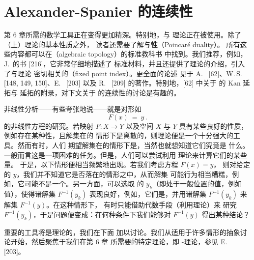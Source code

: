 
\section{Alexander-Spanier \trCohomology{}的连续性}
\label{sec:alexander-spanier-continuity}

%
%
%
%
%

第 6 章所需的数学工具正在变得更加精深。特别地，\trHomology{}与%
\trCohomology{}理论正在被使用。除了（上）\trHomology{}理论的基本性质之外，%
读者还需要了解\trCupProduct{}与\textbf{\trPoincare\trDual{}性}（Poincaré duality）。%
所有这些内容都可以在\textbf{\trAlgebraicTopology}（algebraic topology）的标准教科书
中找到。我们推荐，例如，J.~的书 [216]，它非常仔细地描述了
标准材料，并且还提供了\trFixedPoint{}理论的介绍，引入了与\trDegree{}理论
密切相关的\textbf{\trFixedPointIndex}（fixed point index）。更全面的\trAlgebraicTopology{}论述
见于 A.~\trDold{} [62]、W.\,S.~\trMassey{} [148, 149, 150]、E.~\trSpanier{} [203]
以及 R.~ [209] 的著作。特别地，[62] 中关于%
\trHomotopyInvariant{}\trFunctor{}的 Kan 延拓与 \trCech{}延拓的附录，对下文关于%
\trHomotopyInvariant{}\trFunctor{}的连续性的讨论是有趣的。

非线性分析——有些夸张地说——就是对形如
\[F(x)\ =\ y\,.
\]
的非线性方程的研究。若映射 $F\colon X\to Y$ 以及\trTopology{}空间 $X$ 与 $Y$%
具有某些良好的性质，例如存在某种\trCompact{}性，且解集在\trGeneric{}的%
情形下是离散的，则\trDegree{}理论便是一个十分强大的工具。然而有时，人们%
期望解集在\trGeneric{}的情形下是\trManifold，当然也就想知道它们究竟是%
什么。一般而言这是一项困难的任务。但是，人们可以尝试利用%
\trHomology{}理论来计算它们的某些\trInvariant{}量。
于是，以下情形便相当频繁地出现。若我们考虑方程 $F(x)=y$，%
则对给定的 $y$，我们并不知道它是否落在\trGeneric{}的情形之中，从而解集%
可能行为相当糟糕，例如，它可能不是一个\trManifold。另一方面，可以选取%
\trGeneric{}的 $y_{k}$（即处于一般位置的值，例如\trRegular{}值），使得诸解集%
 $F^{-1}(y_{k})$ 表现良好，例如，它们是\trManifold，并用诸解集%
 $F^{-1}(y_{k})$ 来\trApproximation{}解集 $F^{-1}(y)$。在这种情形下，%
有时只能借助代数手段（利用\trHomology{}理论）来
研究 $F^{-1}(y_{k})$，于是问题便变成：在何种条件下我们能够对
$F^{-1}(y)$ 得出某种结论？

重要的工具将是\trHomology{}理论的\trContinuity，我们在下面
加以讨论。我们从适用于许多情形的抽象讨论开始，然后聚焦于我们在第 6 章
所需要的特定理论，即 \trAlexander-\trSpanier{}\trCohomology{}理论，参见
E.~\trSpanier{} [203]。

